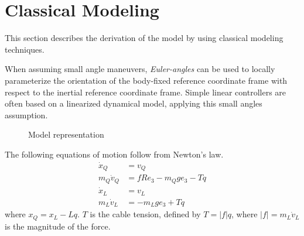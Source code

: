 \section{Classical Modeling}\label{sec:mod.clas}
This section describes the derivation of the model by using classical modeling techniques.

When assuming small angle maneuvers, \textit{Euler-angles} can be used to locally parameterize the orientation of the body-fixed reference coordinate frame with respect to the inertial reference coordinate frame. Simple linear controllers are often based on a linearized dynamical model, applying this small angles assumption. 

\begin{figure}[h!]
	\centering
	\caption{Model representation\label{fig:}}
\end{figure}		

The following equations of motion follow from Newton's law.
\begin{equation}\label{eq:newton}
\begin{aligned}
\dot{x}_Q &= v_Q\\
m_Q\dot{v}_Q &=fRe_3-m_Qge_3-Tq\\
\dot{x}_L &= v_L\\
m_L\dot{v}_L &=-m_Lge_3+Tq
\end{aligned}
\end{equation}
where $ x_Q = x_L-Lq $. $ T $ is the cable tension, defined by $ T=|f| q $, where $ |f| = m_L\dot{v}_L $ is the magnitude of the force.

